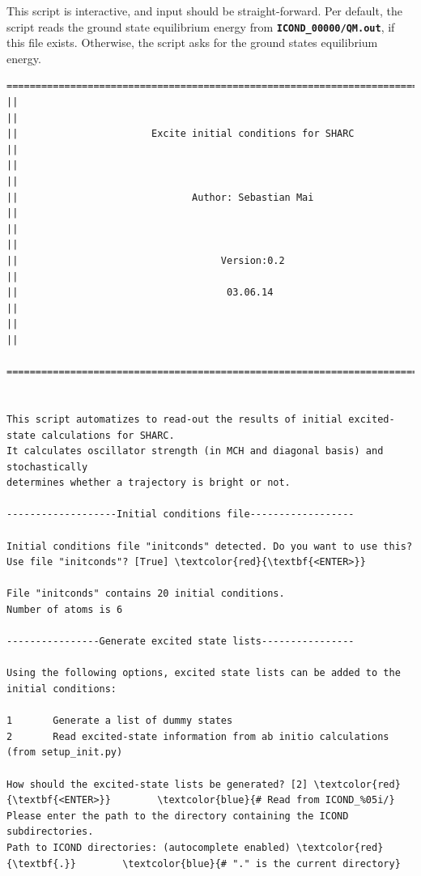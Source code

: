 \documentclass[a4paper,11pt,DIV=15,openany]{scrbook}
\newcommand{\ttt}[1]{\textbf{\texttt{#1}}}
\begin{document}
This script is interactive, and input should be straight-forward. Per default, the script reads the ground state equilibrium energy from \ttt{ICOND\_00000/QM.out}, if this file exists. Otherwise, the script asks for the ground states equilibrium energy.

\begin{oframed}
\footnotesize\begin{Verbatim}[commandchars=\\\{\}]
  ================================================================================
||                                                                                ||
||                       Excite initial conditions for SHARC                      ||
||                                                                                ||
||                              Author: Sebastian Mai                             ||
||                                                                                ||
||                                   Version:0.2                                  ||
||                                    03.06.14                                    ||
||                                                                                ||
  ================================================================================


This script automatizes to read-out the results of initial excited-state calculations for SHARC.
It calculates oscillator strength (in MCH and diagonal basis) and stochastically 
determines whether a trajectory is bright or not.
  
-------------------Initial conditions file------------------

Initial conditions file "initconds" detected. Do you want to use this?
Use file "initconds"? [True] \textcolor{red}{\textbf{<ENTER>}}

File "initconds" contains 20 initial conditions.
Number of atoms is 6

----------------Generate excited state lists----------------

Using the following options, excited state lists can be added to the initial conditions:

1       Generate a list of dummy states
2       Read excited-state information from ab initio calculations (from setup_init.py)

How should the excited-state lists be generated? [2] \textcolor{red}{\textbf{<ENTER>}}        \textcolor{blue}{# Read from ICOND_%05i/}
Please enter the path to the directory containing the ICOND subdirectories.
Path to ICOND directories: (autocomplete enabled) \textcolor{red}{\textbf{.}}        \textcolor{blue}{# "." is the current directory}


\end{Verbatim}
\end{oframed}
\end{document}
